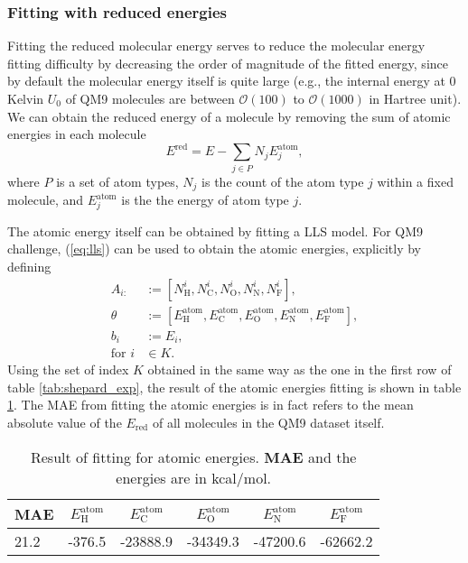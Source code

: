\documentclass[12pt]{article}
\begin{document}
\subsubsection{Fitting with reduced energies}
\label{subsubsec:ered}
Fitting the reduced molecular energy serves to reduce the molecular energy fitting difficulty by decreasing the order of magnitude of the fitted energy, since by default the molecular energy itself is quite large (e.g., the internal energy at $0$ Kelvin $U_0$ of QM9 molecules are between $\mathcal{O}(100)$ to $\mathcal{O}(1000)$ in Hartree unit). We can obtain the reduced energy of a molecule by removing the sum of atomic energies in each molecule
\begin{equation}
	E^\text{red} = E - \sum_{j \in P} N_j E^\text{atom}_j,
\end{equation}
where $P$ is a set of atom types, $N_j$ is the count of the atom type $j$ within a fixed molecule, and $E^\text{atom}_j$ is the the energy of atom type $j$.

The atomic energy itself can be obtained by fitting a LLS model. For QM9 challenge, (\ref{eq:lls}) can be used to obtain the atomic energies, explicitly by defining
\begin{equation}
	\begin{split}
		A_{i:} &:= [N^i_\text{H}, N^i_\text{C}, N^i_\text{O}, N^i_\text{N}, N^i_\text{F}], \\
		\theta &:= [E^\text{atom}_\text{H}, E^\text{atom}_\text{C}, E^\text{atom}_\text{O}, E^\text{atom}_\text{N}, E^\text{atom}_\text{F}], \\
		b_i &:= E_i, \\
		\text{for }i &\in K.
	\end{split}
\end{equation}
Using the set of index $K$ obtained in the same way as the one in the first row of table \ref{tab:shepard_exp}, the result of the atomic energies fitting is shown in table \ref{tab:atomic_exp}. The MAE from fitting the atomic energies is in fact refers to the mean absolute value of the $E_\text{red}$ of all molecules in the QM9 dataset itself.

\begin{table}[H]
	\centering
	\caption{Result of fitting for atomic energies. \textbf{MAE} and the energies are in kcal/mol.}
	\begin{tabular}{|l|l|l|l|l|l|}
		\hline
		\multicolumn{1}{|c|}{\textbf{MAE}} & \multicolumn{1}{c|}{$E^\text{atom}_\text{H}$} & \multicolumn{1}{c|}{$E^\text{atom}_\text{C}$} & \multicolumn{1}{c|}{$E^\text{atom}_\text{O}$} & \multicolumn{1}{c|}{$E^\text{atom}_\text{N}$} & \multicolumn{1}{c|}{$E^\text{atom}_\text{F}$} \\ \hline
		21.2  &	-376.5  & -23888.9 & -34349.3 & -47200.6 & -62662.2 \\ \hline
	\end{tabular}
	\label{tab:atomic_exp}
\end{table}
\end{document}
